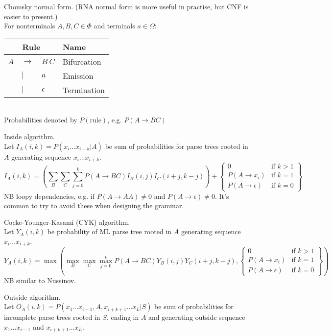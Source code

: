 \documentclass{beamer}
\begin{document}
\begin{frame}{}

\itemb
\item Chomsky normal form. (RNA normal form is more useful in practise, but CNF is easier to present.) \\
For nonterminals $A,B,C \in \Phi$ and terminals $a \in \Omega$:
\begin{tabular}{rll|l}
\multicolumn{3}{c|}{Rule} & Name \\
\hline
$A$ & $\to$ & $B\ C$      & Bifurcation \\
    &   $|$ & $a$         & Emission \\
    &   $|$ & $\epsilon$  & Termination
\end{tabular} \\
Probabilities denoted by $P(\mbox{rule})$, e.g. $P(A \to BC)$
\item Inside algorithm. \\
Let $I_A(i,k) = P(x_i \ldots x_{i+k} | A)$ be sum of probabilities for parse trees rooted in $A$ generating sequence $x_i \ldots x_{i+k}$.
\[
I_A(i,k) = \left( \sum_B \sum_C \sum_{j=0}^k P(A \to BC) I_B(i,j) I_C(i+j,k-j) \right)
+ \left\{ \begin{array}{ll}
0 & \mbox{if $k>1$} \\
P(A \to x_i) & \mbox{if $k=1$} \\
P(A \to \epsilon) & \mbox{if $k=0$}
\end{array} \right\}
\]
NB loopy dependencies, e.g. if $P(A \to AA) \neq 0$ and $P(A \to \epsilon) \neq 0$.
It's common to try to avoid these when designing the grammar.
\item Cocke-Younger-Kasami (CYK) algorithm. \\
Let $Y_A(i,k)$ be probability of ML parse tree rooted in $A$ generating sequence $x_i \ldots x_{i+k}$.
\[
Y_A(i,k) = \max \left( \max_B \max_C \max_{j=0}^k P(A \to BC) Y_B(i,j) Y_C(i+j,k-j),
\left\{ \begin{array}{ll}
0 & \mbox{if $k>1$} \\
P(A \to x_i) & \mbox{if $k=1$} \\
P(A \to \epsilon) & \mbox{if $k=0$}
\end{array} \right\}
\right)
\]
NB similar to Nussinov.
\item Outside algorithm. \\
Let $O_A(i,k) = P(x_1 \ldots x_{i-1},A,x_{i+k+1} \ldots x_L|S)$
be sum of probabilities for incomplete parse trees rooted in $S$, ending in $A$ and generating outside sequence $x_1 \ldots x_{i-1}$ and $x_{i+k+1} \ldots x_L$.

\end{frame}
\end{document}
